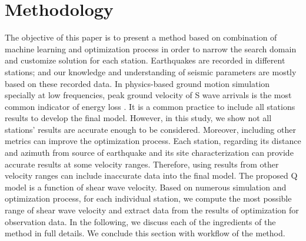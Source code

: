 
\section{Methodology}

The objective of this paper is to present a method based on combination of machine learning and optimization process in order to narrow the search domain and customize solution for each station. Earthquakes are recorded in different stations; and our knowledge and understanding of seismic parameters are mostly based on these recorded data. In physics-based ground motion simulation specially at low frequencies, peak ground velocity of S wave arrivals is the most common indicator of energy loss \citep[e.g., see][]{olsen2003estimation}. It is a common practice to include all stations results to develop the final model. However, in this study, we show not all stations' results are accurate enough to be considered. Moreover, including other metrics can improve the optimization process. Each station, regarding its distance and azimuth from source of earthquake and its site characterization can provide accurate results at some velocity ranges. Therefore, using results from other velocity ranges can include inaccurate data into the final model. The proposed Q model is a function of shear wave velocity. Based on numerous simulation and optimization process, for each individual station, we compute the most possible range of shear wave velocity and extract data from the results of optimization for observation data. In the following, we discuss each of the ingredients of the method in full details.  We conclude this section with workflow of the method.\\




















